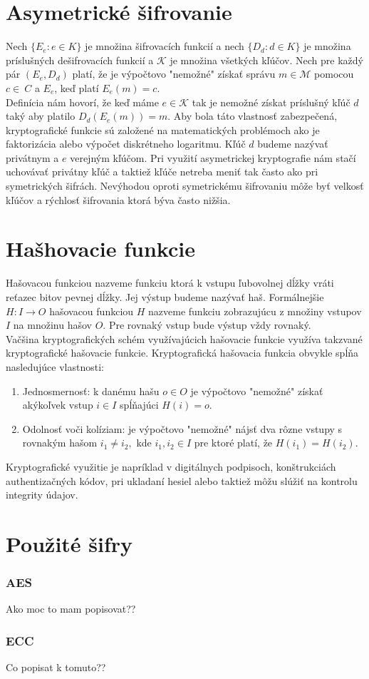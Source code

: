 \section{Asymetrické šifrovanie}
	Nech $\{E_e : e \in K\}$ je množina šifrovacích funkcií a nech  $\{D_d : d \in K\}$ je množina príslušných dešifrovacích funkcií a $\mathcal K$ je množina všetkých kľúčov. Nech pre každý pár $(E_e,D_d)$ platí, že je výpočtovo "nemožné" získať správu $m \in\mathcal M$ pomocou $c \in\	 C$ a $E_e$, keď platí $E_e(m) = c$. 
	\\Definícia nám hovorí, že keď máme $e \in\mathcal K$ tak je nemožné získat príslušný kľúč $d$ taký aby platilo $D_d(E_e(m)) = m$. Aby bola táto vlastnosť zabezpečená,  kryptografické funkcie sú založené na matematických problémoch ako je faktorizácia alebo výpočet diskrétneho logaritmu. Kľúč $d$ budeme nazývať privátnym a $e$ verejným kľúčom. Pri využití asymetrickej kryptografie nám stačí uchovávať privátny kľúč a taktiež kľúče netreba meniť tak často ako pri symetrických šifrách. Nevýhodou oproti symetrickému šifrovaniu môže byť velkosť kľúčov a rýchlosť šifrovania ktorá býva často nižšia.	
		
	
\section{Hašhovacie funkcie}
	Hašovacou funkciou nazveme funkciu ktorá k vstupu ľubovolnej dĺžky vráti reťazec bitov pevnej dĺžky. Jej výstup budeme nazývať haš. Formálnejšie  $H : I \rightarrow O$  hašovacou funkciou $H$ nazveme funkciu zobrazujúcu z množiny vstupov $I$ na množinu hašov $O$.  Pre rovnaký vstup bude výstup vždy rovnaký.
	\\
	Vačšina kryptografických schém využívajúcich hašovacie funkcie využíva takzvané kryptografické hašovacie funkcie. Kryptografická hašovacia funkcia obvykle spĺňa nasledujúce vlastnosti:
	\begin{enumerate}
		\item Jednosmernosť: k danému hašu $o \in O$ je výpočtovo "nemožné" získať akýkoľvek vstup $i \in I$ spĺňajúci $H(i) = o$.
		\item Odolnosť voči kolíziam: je výpočtovo "nemožné" nájsť dva rôzne vstupy s rovnakým hašom $i_1 \ne i_2,$ kde $i_1,i_2 \in I$ pre ktoré platí, že $H(i_1) = H(i_2)$.
	\end{enumerate}
	Kryptografické využitie je napríklad v digitálnych podpisoch, konštrukciách authentizačných kódov, pri ukladaní hesiel alebo taktiež môžu slúžiť na kontrolu integrity údajov.


\section{Použité šifry}
	\subsubsection{AES}
		Ako moc to mam popisovat??
	\subsubsection{ECC}
		Co popisat k tomuto?? 
		